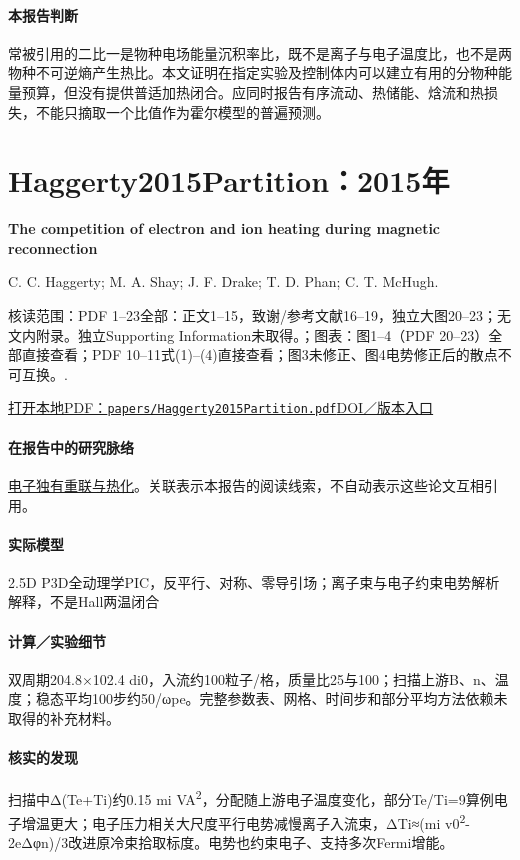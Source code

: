 \paragraph{本报告判断}常被引用的二比一是物种电场能量沉积率比，既不是离子与电子温度比，也不是两物种不可逆熵产生热比。本文证明在指定实验及控制体内可以建立有用的分物种能量预算，但没有提供普适加热闭合。应同时报告有序流动、热储能、焓流和热损失，不能只摘取一个比值作为霍尔模型的普遍预测。

\section{Haggerty2015Partition：2015年}\label{paper:Haggerty2015Partition}

\textbf{The competition of electron and ion heating during magnetic reconnection}\citep{Haggerty2015Partition}\

C. C. Haggerty;  M. A. Shay;  J. F. Drake;  T. D. Phan;  C. T. McHugh.

\textsf{核读范围：}PDF 1–23全部：正文1–15，致谢/参考文献16–19，独立大图20–23；无文内附录。独立Supporting Information未取得。；\textsf{图表：}图1–4（PDF 20–23）全部直接查看；PDF 10–11式(1)–(4)直接查看；图3未修正、图4电势修正后的散点不可互换。.

\href{run:papers/Haggerty2015Partition.pdf}{打开本地PDF：\texttt{papers/Haggerty2015Partition.pdf}}\quad\href{https://doi.org/10.1002/2015GL065961}{DOI／版本入口}

\paragraph{在报告中的研究脉络}\hyperref[story:energy]{电子独有重联与热化}。关联表示本报告的阅读线索，不自动表示这些论文互相引用。

\paragraph{实际模型}2.5D P3D全动理学PIC，反平行、对称、零导引场；离子束与电子约束电势解析解释，不是Hall两温闭合

\paragraph{计算／实验细节}双周期204.8×102.4 di0，入流约100粒子/格，质量比25与100；扫描上游B、n、温度；稳态平均100步约50/ωpe。完整参数表、网格、时间步和部分平均方法依赖未取得的补充材料。

\paragraph{核实的发现}扫描中Δ(Te+Ti)约0.15 mi VA\textsuperscript{2}，分配随上游电子温度变化，部分Te/Ti=9算例电子增温更大；电子压力相关大尺度平行电势减慢离子入流束，ΔTi≈(mi v0\textsuperscript{2}-2eΔφn)/3改进原冷束拾取标度。电势也约束电子、支持多次Fermi增能。

